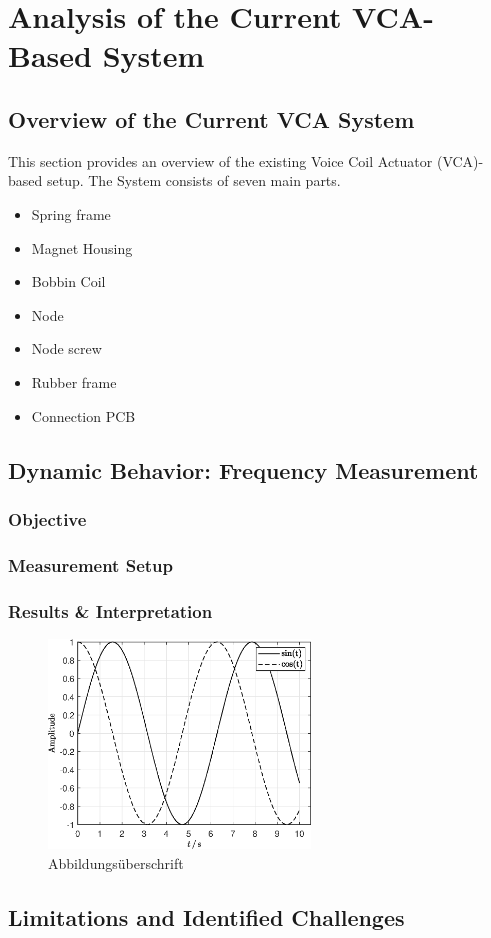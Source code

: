 \chapter{Analysis of the Current VCA-Based System}

\section{Overview of the Current VCA System}
This section provides an overview of the existing Voice Coil Actuator (VCA)-based setup. The System consists of seven main parts. 

\begin{itemize}
    \item Spring frame
    \item Magnet Housing
    \item Bobbin Coil
    \item Node
    \item Node screw
    \item Rubber frame
    \item Connection PCB
\end{itemize}

\section{Dynamic Behavior: Frequency Measurement}

\subsection{Objective}

\subsection{Measurement Setup}


\subsection{Results \& Interpretation}

\begin{figure}[!ht]
    \centering
    \includegraphics[width=0.62\textwidth]{img/Test_plot_1.eps}
    \caption[Kurzbeschreibung]{Abbildungsüberschrift}
    \label{fig:label}
\end{figure}

\section{Limitations and Identified Challenges}
